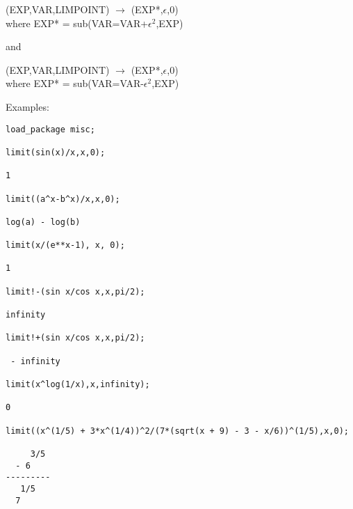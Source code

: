 \vspace{.1in}
 (EXP,VAR,LIMPOINT) $\rightarrow$
\hspace*{2em}{\tt LIMIT}(EXP*,$\epsilon$,0) \\
where EXP* = sub(VAR=VAR+$\epsilon^2$,EXP)

and

 (EXP,VAR,LIMPOINT) $\rightarrow$
\hspace*{2em}{\tt LIMIT}(EXP*,$\epsilon$,0) \\
where EXP* = sub(VAR=VAR-$\epsilon^2$,EXP)

Examples:
\begin{verbatim}
load_package misc;

limit(sin(x)/x,x,0);

1

limit((a^x-b^x)/x,x,0);

log(a) - log(b)

limit(x/(e**x-1), x, 0);

1

limit!-(sin x/cos x,x,pi/2);

infinity

limit!+(sin x/cos x,x,pi/2);

 - infinity

limit(x^log(1/x),x,infinity);

0

limit((x^(1/5) + 3*x^(1/4))^2/(7*(sqrt(x + 9) - 3 - x/6))^(1/5),x,0);

     3/5
  - 6
---------
   1/5
  7

\end{verbatim}

